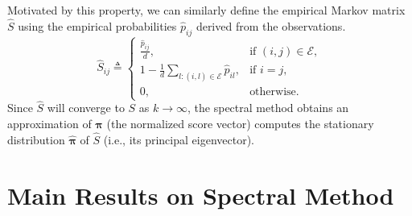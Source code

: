 \documentclass[sigconf,nonacm,pbalance]{acmart}
\begin{document}
Motivated by this property, we can similarly define the empirical Markov matrix $\hat{S}$ using the empirical probabilities $\hat{p}_{ij}$ derived from the observations.
\begin{equation}
    \hat{S}_{ij} \triangleq \begin{cases}
        \frac{\hat{p}_{ij}}{d}, & \text{if } (i, j) \in \mathcal{E}, \\
        1 - \frac{1}{d} \sum_{l: (i, l) \in \mathcal{E}} \hat{p}_{il}, & \text{if } i = j, \\
        0, & \text{otherwise.}
    \end{cases}
\end{equation}
Since $\hat{S}$ will converge to $S$ as $k \to \infty$, the spectral method obtains an approximation of $\bm{\pi}$ (the normalized score vector) computes the stationary distribution $\hat{\bm{\pi}}$ of $\hat{S}$ (i.e., its principal eigenvector).

\section{Main Results on Spectral Method}
\end{document}
